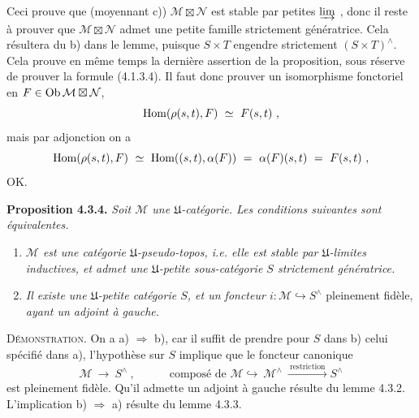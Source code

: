 \noindent Ceci prouve que (moyennant c)) $\mathcal M\boxtimes\mathcal N$ est stable par petites $\varinjlim$ , donc il reste à prouver que $\mathcal M\boxtimes\mathcal N$ admet une petite famille strictement génératrice. Cela résultera du b) dans le lemme, puisque $S\times T$ engendre strictement $(S\times T)^\wedge$. Cela prouve en même temps la dernière assertion de la proposition, sous réserve de prouver la formule (4.1.3.4). Il faut donc prouver un isomorphisme fonctoriel en $F\in\mathrm{Ob}\,\mathcal M\boxtimes\mathcal N$, %
\[
\mathrm{Hom}(\rho(s,t),F)\ \simeq\ F(s,t)\ ,
\]
mais par adjonction on a
\[
\Hom(\rho(s,t),F)\ \simeq\ \Hom((s,t),\alpha(F))\ =\ \alpha(F)(s,t)\ =\ F(s,t)\ ,
\]
OK.


\noindent{}\textbf{Proposition 4.3.4.} \textit{Soit $\mathcal M$ une $\mathfrak U$-catégorie. Les conditions suivantes sont équivalentes.}
\begin{enumerate}[label={}]
\item[\textit{a)}] \textit{$\mathcal M$ est une catégorie $\mathfrak U$-pseudo-topos, i.e. elle est stable par $\mathfrak U$-limites inductives, et admet une $\mathfrak U$-petite sous-catégorie $S$ strictement génératrice.}
\item[\textit{b)}] \textit{Il existe une $\mathfrak U$-petite catégorie $S$, et un foncteur $i:\mathcal M\hookrightarrow S^\wedge$} pleinement fidèle, \textit{ayant un adjoint à gauche.}
\end{enumerate}

\noindent\textsc{Démonstration}. On a a) $\Longrightarrow$ b), car il suffit de prendre pour $S$ dans b) celui spécifié dans a), l'hypothèse sur $S$ implique que le foncteur canonique
\[
\mathcal M\ \longrightarrow\ S^\wedge\ ,\qquad\quad \text{composé de } \mathcal M\hookrightarrow\ \mathcal M^\wedge\ \xrightarrow{\ \text{restriction}\ }S^\wedge
\]
est pleinement fidèle. Qu'il admette un adjoint à gauche résulte du lemme 4.3.2. L'implication b) $\Longrightarrow$ a) résulte du lemme 4.3.3.

